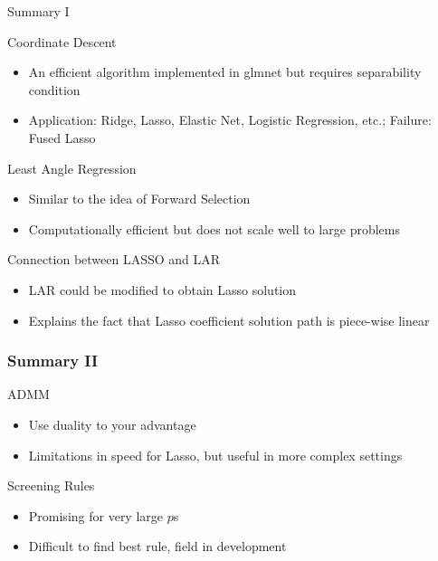 \documentclass[handout]{beamer}
\begin{document}
\begin{frame}{Summary I}
\begin{block}{Coordinate Descent}
\begin{itemize}
    \item An efficient algorithm implemented in glmnet but requires separability condition
    \item Application: Ridge, Lasso, Elastic Net, Logistic Regression, etc.; Failure: Fused Lasso
\end{itemize}
\begin{block}{Least Angle Regression }
\begin{itemize}
    \item Similar to the idea of Forward Selection 
    \item Computationally efficient but does not scale well to large problems
\end{itemize}
\begin{block}{Connection between LASSO and LAR}
\begin{itemize}
    \item LAR could be modified to obtain Lasso solution 
    \item Explains the fact that Lasso coefficient solution path is piece-wise linear
\end{itemize}

\end{block}

\end{block}

\end{block}
\end{frame}

\begin{frame}
\frametitle{Summary II}
\begin{block}{ADMM}
\begin{itemize}
	\item Use duality to your advantage
	\item Limitations in speed for Lasso, but useful in more complex settings
\end{itemize}
\begin{block}{Screening Rules}
\begin{itemize}
    \item Promising for very large $p$s 
    \item Difficult to find best rule, field in development
\end{itemize}


\end{block}


\end{block}

\end{frame}
\end{document}
